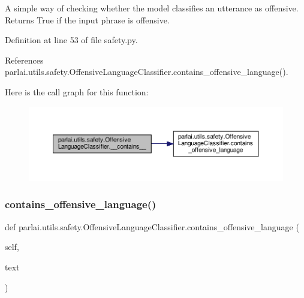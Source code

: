 \begin{DoxyVerb}A simple way of checking whether the model classifies an utterance as
offensive. Returns True if the input phrase is offensive.
\end{DoxyVerb}
 

Definition at line 53 of file safety.\+py.



References parlai.\+utils.\+safety.\+Offensive\+Language\+Classifier.\+contains\+\_\+offensive\+\_\+language().

Here is the call graph for this function\+:
\nopagebreak
\begin{figure}[H]
\begin{center}
\leavevmode
\includegraphics[width=350pt]{classparlai_1_1utils_1_1safety_1_1OffensiveLanguageClassifier_a86de8f64f68732b91d4cdfdf65dd841c_cgraph}
\end{center}
\end{figure}
\mbox{\label{classparlai_1_1utils_1_1safety_1_1OffensiveLanguageClassifier_a7f4e833bea93ab9f920f2dd2a4b6e586}} 
\subsubsection{\texorpdfstring{contains\+\_\+offensive\+\_\+language()}{contains\_offensive\_language()}}
{\footnotesize\ttfamily def parlai.\+utils.\+safety.\+Offensive\+Language\+Classifier.\+contains\+\_\+offensive\+\_\+language (\begin{DoxyParamCaption}\item[{}]{self,  }\item[{}]{text }\end{DoxyParamCaption})}

